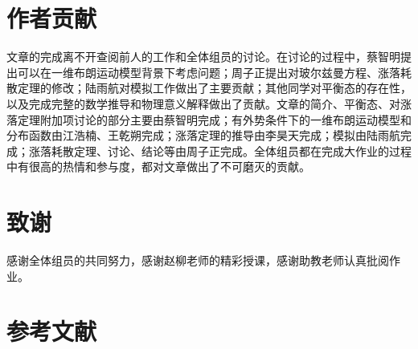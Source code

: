 \section{作者贡献}
文章的完成离不开查阅前人的工作和全体组员的讨论。在讨论的过程中，蔡智明提出可以在一维布朗运动模型背景下考虑问题；周子正提出对玻尔兹曼方程、涨落耗散定理的修改；陆雨航对模拟工作做出了主要贡献；其他同学对平衡态的存在性，以及完成完整的数学推导和物理意义解释做出了贡献。文章的简介、平衡态、对涨落定理附加项讨论的部分主要由蔡智明完成；有外势条件下的一维布朗运动模型和分布函数由江浩楠、王乾朔完成；涨落定理的推导由李昊天完成；模拟由陆雨航完成；涨落耗散定理、讨论、结论等由周子正完成。全体组员都在完成大作业的过程中有很高的热情和参与度，都对文章做出了不可磨灭的贡献。
\section{致谢}
感谢全体组员的共同努力，感谢赵柳老师的精彩授课，感谢助教老师认真批阅作业。
\section{参考文献}
\printbibliography[heading=none]